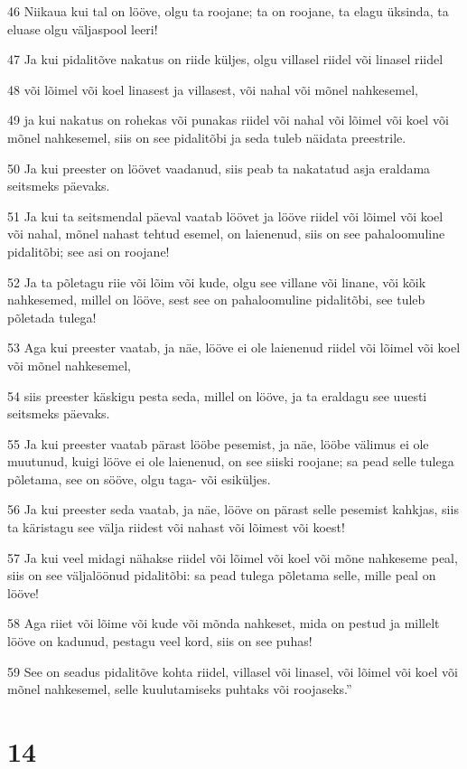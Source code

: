 \par 46 Niikaua kui tal on lööve, olgu ta roojane; ta on roojane, ta elagu üksinda, ta eluase olgu väljaspool leeri!
\par 47 Ja kui pidalitõve nakatus on riide küljes, olgu villasel riidel või linasel riidel
\par 48 või lõimel või koel linasest ja villasest, või nahal või mõnel nahkesemel,
\par 49 ja kui nakatus on rohekas või punakas riidel või nahal või lõimel või koel või mõnel nahkesemel, siis on see pidalitõbi ja seda tuleb näidata preestrile.
\par 50 Ja kui preester on löövet vaadanud, siis peab ta nakatatud asja eraldama seitsmeks päevaks.
\par 51 Ja kui ta seitsmendal päeval vaatab löövet ja lööve riidel või lõimel või koel või nahal, mõnel nahast tehtud esemel, on laienenud, siis on see pahaloomuline pidalitõbi; see asi on roojane!
\par 52 Ja ta põletagu riie või lõim või kude, olgu see villane või linane, või kõik nahkesemed, millel on lööve, sest see on pahaloomuline pidalitõbi, see tuleb põletada tulega!
\par 53 Aga kui preester vaatab, ja näe, lööve ei ole laienenud riidel või lõimel või koel või mõnel nahkesemel,
\par 54 siis preester käskigu pesta seda, millel on lööve, ja ta eraldagu see uuesti seitsmeks päevaks.
\par 55 Ja kui preester vaatab pärast lööbe pesemist, ja näe, lööbe välimus ei ole muutunud, kuigi lööve ei ole laienenud, on see siiski roojane; sa pead selle tulega põletama, see on sööve, olgu taga- või esiküljes.
\par 56 Ja kui preester seda vaatab, ja näe, lööve on pärast selle pesemist kahkjas, siis ta käristagu see välja riidest või nahast või lõimest või koest!
\par 57 Ja kui veel midagi nähakse riidel või lõimel või koel või mõne nahkeseme peal, siis on see väljalöönud pidalitõbi: sa pead tulega põletama selle, mille peal on lööve!
\par 58 Aga riiet või lõime või kude või mõnda nahkeset, mida on pestud ja millelt lööve on kadunud, pestagu veel kord, siis on see puhas!
\par 59 See on seadus pidalitõve kohta riidel, villasel või linasel, või lõimel või koel või mõnel nahkesemel, selle kuulutamiseks puhtaks või roojaseks.”

\chapter{14}

